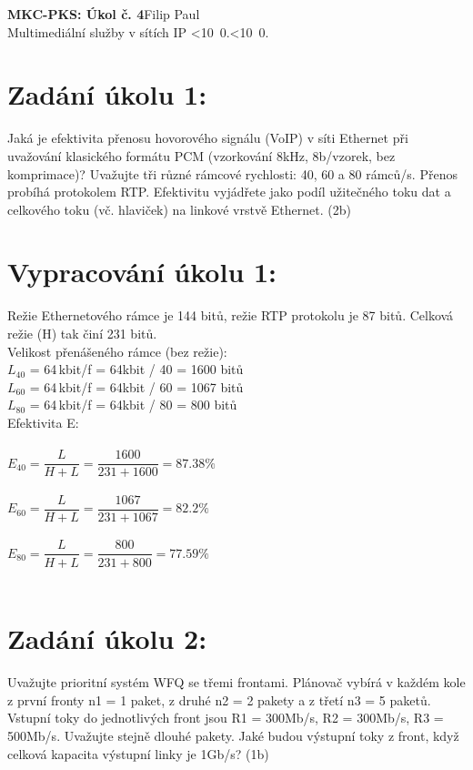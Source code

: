 \documentclass[10pt, a4paper]{article}%
\def\mydate{\leavevmode\hbox{\twodigits\day.\twodigits\month.\the\year}}
\def\twodigits#1{\ifnum#1<10 0\fi\the#1}
\begin{document}
\begin{flushleft}%
	\textbf{\Large{MKC-PKS: Úkol č. 4}}\hfill Filip Paul\\
	\large{Multimediální služby v sítích IP \hfill\mydate}
\end{flushleft}
\section*{Zadání úkolu 1:}
Jaká je efektivita přenosu hovorového signálu (VoIP) v síti Ethernet při uvažování klasického
formátu PCM (vzorkování 8kHz, 8b/vzorek, bez komprimace)? Uvažujte tři různé rámcové
rychlosti: 40, 60 a 80 rámců/s. Přenos probíhá protokolem RTP.
Efektivitu vyjádřete jako podíl užitečného toku dat a celkového toku (vč. hlaviček) na linkové
vrstvě Ethernet. (2b)

\section*{Vypracování úkolu 1:}
\noindent Režie Ethernetového rámce je 144 bitů, režie RTP protokolu je 87 bitů.
Celková režie (H) tak činí 231 bitů.\\
Velikost přenášeného rámce (bez režie):\\
$L_{40}$ = 64\,kbit/f = 64kbit / 40 = 1600 bitů\\
$L_{60}$ = 64\,kbit/f = 64kbit / 60 = 1067 bitů\\
$L_{80}$ = 64\,kbit/f = 64kbit / 80 = 800 bitů\\

\noindent Efektivita E:\\\\
$E_{40} = \dfrac{L}{H+L} = \dfrac{1600}{231+1600} = 87.38\%$\\\\
$E_{60} = \dfrac{L}{H+L} = \dfrac{1067}{231+1067} = 82.2\%$\\\\
$E_{80} = \dfrac{L}{H+L} = \dfrac{800}{231+800} = 77.59\%$\\\\
	
\section*{Zadání úkolu 2:}
Uvažujte prioritní systém WFQ se třemi frontami. Plánovač vybírá v každém kole z první fronty 
n1 = 1 paket, z druhé n2 = 2 pakety a z třetí n3 = 5 paketů. Vstupní toky do jednotlivých front 
jsou R1 = 300Mb/s, R2 = 300Mb/s, R3 = 500Mb/s. Uvažujte stejně dlouhé pakety. Jaké budou 
výstupní toky z front, když celková kapacita výstupní linky je 1Gb/s? (1b)
\end{document}
